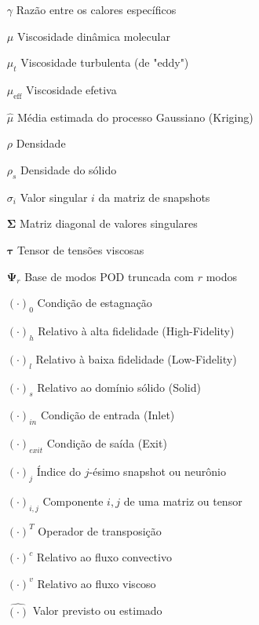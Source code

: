 \begin{itemize}
\item[$\gamma$] Razão entre os calores específicos
\item[$\mu$] Viscosidade dinâmica molecular
\item[$\mu_t$] Viscosidade turbulenta (de "eddy")
\item[$\mu_{\text{eff}}$] Viscosidade efetiva
\item[$\hat{\mu}$] Média estimada do processo Gaussiano (Kriging)
\item[$\rho$] Densidade
\item[$\rho_s$] Densidade do sólido
\item[$\sigma_i$] Valor singular $i$ da matriz de snapshots
\item[$\mathbf{\Sigma}$] Matriz diagonal de valores singulares
\item[$\boldsymbol{\tau}$] Tensor de tensões viscosas
\item[$\mathbf{\Psi}_r$] Base de modos POD truncada com $r$ modos
\end{itemize}

\begin{itemize}
\item[$(\cdot)_0$] Condição de estagnação
\item[$(\cdot)_h$] Relativo à alta fidelidade (High-Fidelity)
\item[$(\cdot)_l$] Relativo à baixa fidelidade (Low-Fidelity)
\item[$(\cdot)_s$] Relativo ao domínio sólido (Solid)
\item[$(\cdot)_{in}$] Condição de entrada (Inlet)
\item[$(\cdot)_{exit}$] Condição de saída (Exit)
\item[$(\cdot)_{j}$] Índice do $j$-ésimo snapshot ou neurônio
\item[$(\cdot)_{i,j}$] Componente $i,j$ de uma matriz ou tensor
\item[$(\cdot)^T$] Operador de transposição
\item[$(\cdot)^c$] Relativo ao fluxo convectivo
\item[$(\cdot)^v$] Relativo ao fluxo viscoso
\item[$\hat{(\cdot)}$] Valor previsto ou estimado
\end{itemize}